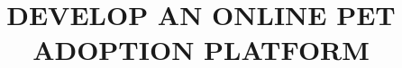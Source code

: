 \documentclass[12pt,a4paper,oneside]{book} %
\title{DEVELOP AN ONLINE PET ADOPTION PLATFORM}
\begin{document}
\coverpage

\frontmatter

\begin{acknowledgment}
  
\end{acknowledgment}


\begin{commitment}
  
\end{commitment}


\begin{abstract}
  
\end{abstract}

\tableofcontents

\listoftables

\listoffigures

\newpage

\begin{abbreviations}
  
\end{abbreviations}


\mainmatter

\fancyhead{}  %
\renewcommand{\footrulewidth}{0.4pt}

\pagestyle{fancy}  %












\clearpage

\end{document}
